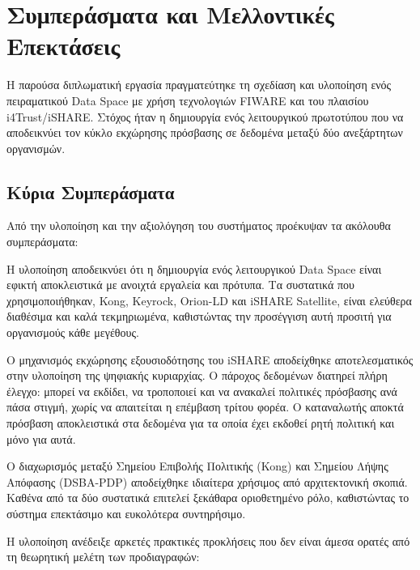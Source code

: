 \chapter{Συμπεράσματα και Μελλοντικές Επεκτάσεις}
\label{ch:conclusions}

Η παρούσα διπλωματική εργασία πραγματεύτηκε τη σχεδίαση και υλοποίηση ενός
πειραματικού \textlatin{Data Space} με χρήση τεχνολογιών
\textlatin{FIWARE} και του πλαισίου \textlatin{i4Trust}/\textlatin{iSHARE}.
Στόχος ήταν η δημιουργία ενός λειτουργικού πρωτοτύπου που να αποδεικνύει τον
κύκλο εκχώρησης πρόσβασης σε δεδομένα μεταξύ δύο ανεξάρτητων οργανισμών.

\section{Κύρια Συμπεράσματα}
\label{sec:results}

Από την υλοποίηση και την αξιολόγηση του συστήματος προέκυψαν τα ακόλουθα
συμπεράσματα:

Η υλοποίηση αποδεικνύει ότι η δημιουργία ενός λειτουργικού \textlatin{Data
Space} είναι εφικτή αποκλειστικά με ανοιχτά εργαλεία και πρότυπα. Τα
συστατικά που χρησιμοποιήθηκαν, \textlatin{Kong}, \textlatin{Keyrock},
\textlatin{Orion-LD} και \textlatin{iSHARE Satellite}, είναι ελεύθερα
διαθέσιμα και καλά τεκμηριωμένα, καθιστώντας την προσέγγιση αυτή
προσιτή για οργανισμούς κάθε μεγέθους.

Ο μηχανισμός εκχώρησης εξουσιοδότησης του \textlatin{iSHARE} αποδείχθηκε
αποτελεσματικός στην υλοποίηση της ψηφιακής κυριαρχίας. Ο πάροχος δεδομένων
διατηρεί πλήρη έλεγχο: μπορεί να εκδίδει, να τροποποιεί και να ανακαλεί
πολιτικές πρόσβασης ανά πάσα στιγμή, χωρίς να απαιτείται η επέμβαση τρίτου
φορέα. Ο καταναλωτής αποκτά πρόσβαση αποκλειστικά στα δεδομένα για τα
οποία έχει εκδοθεί ρητή πολιτική και μόνο για αυτά.

Ο διαχωρισμός μεταξύ Σημείου Επιβολής Πολιτικής (\textlatin{Kong}) και
Σημείου Λήψης Απόφασης (\textlatin{DSBA-PDP}) αποδείχθηκε ιδιαίτερα
χρήσιμος από αρχιτεκτονική σκοπιά. Καθένα από τα δύο συστατικά επιτελεί
ξεκάθαρα οριοθετημένο ρόλο, καθιστώντας το σύστημα επεκτάσιμο και
ευκολότερα συντηρήσιμο.

Η υλοποίηση ανέδειξε αρκετές πρακτικές προκλήσεις που δεν είναι άμεσα
ορατές από τη θεωρητική μελέτη των προδιαγραφών:

